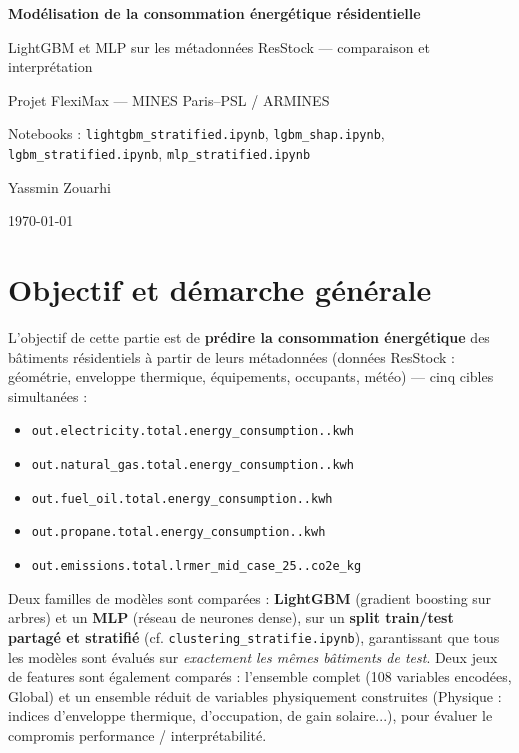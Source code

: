 \documentclass[11pt,a4paper]{article}
\newcommand{\code}[1]{\texttt{#1}}
\begin{document}
\begin{titlepage}
    \centering
    \vspace*{2cm}
    {\LARGE\bfseries\color{headerblue} Modélisation de la consommation énergétique résidentielle\par}
    \vspace{0.5cm}
    {\large LightGBM et MLP sur les métadonnées ResStock --- comparaison et interprétation\par}
    \vspace{1.5cm}
    {\large Projet FlexiMax --- MINES Paris--PSL / ARMINES\par}
    \vspace{0.3cm}
    {\normalsize Notebooks : \code{lightgbm\_stratified.ipynb}, \code{lgbm\_shap.ipynb},
    \code{lgbm\_stratified.ipynb}, \code{mlp\_stratified.ipynb}\par}
    \vfill
    {\normalsize Yassmin Zouarhi \par}
    {\normalsize \today\par}
\end{titlepage}

\tableofcontents
\newpage

\section{Objectif et démarche générale}

L'objectif de cette partie est de \textbf{prédire la consommation énergétique} des bâtiments
résidentiels à partir de leurs métadonnées (données ResStock : géométrie, enveloppe thermique,
équipements, occupants, météo) --- cinq cibles simultanées :

\begin{itemize}
    \item \code{out.electricity.total.energy\_consumption..kwh}
    \item \code{out.natural\_gas.total.energy\_consumption..kwh}
    \item \code{out.fuel\_oil.total.energy\_consumption..kwh}
    \item \code{out.propane.total.energy\_consumption..kwh}
    \item \code{out.emissions.total.lrmer\_mid\_case\_25..co2e\_kg}
\end{itemize}

Deux familles de modèles sont comparées : \textbf{LightGBM} (gradient boosting sur arbres) et un
\textbf{MLP} (réseau de neurones dense), sur un \textbf{split train/test partagé et stratifié}
(cf. \code{clustering\_stratifie.ipynb}), garantissant que tous les modèles sont évalués sur
\emph{exactement les mêmes bâtiments de test}. Deux jeux de features sont également comparés :
l'ensemble complet (108 variables encodées, \og{}Global\fg{}) et un ensemble réduit de variables
physiquement construites (\og{}Physique\fg{} : indices d'enveloppe thermique, d'occupation, de
gain solaire...), pour évaluer le compromis performance / interprétabilité.
\end{document}
